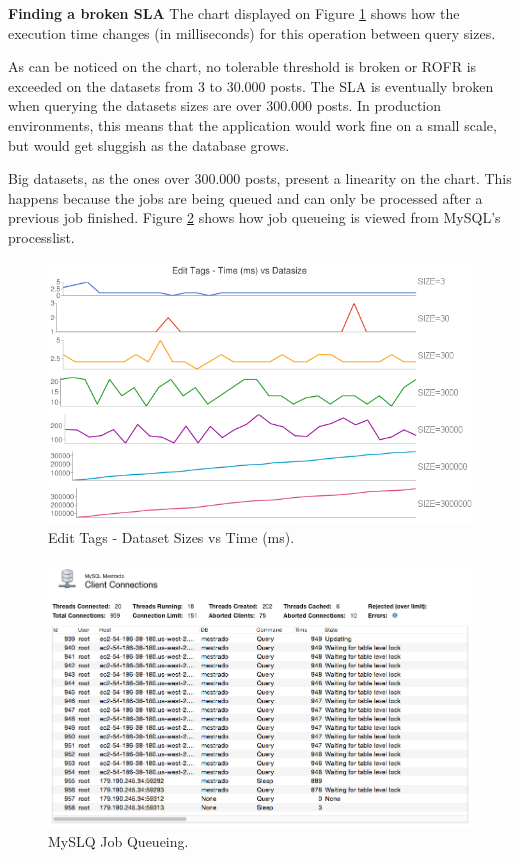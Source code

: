\textbf{Finding a broken SLA}
\hfill \break
The chart displayed on Figure \ref{fig:tags-scenairo-02-chart} shows how the execution time changes (in milliseconds) for this operation between query sizes. 

As can be noticed on the chart, no tolerable threshold is broken or ROFR is exceeded on the datasets from 3 to 30.000 posts. The SLA is eventually broken when querying the datasets sizes are over 300.000 posts. In production environments, this means that the application would work fine on a small scale, but would get sluggish as the database grows.

Big datasets, as the ones over 300.000 posts, present a linearity on the chart. This happens because the jobs are being queued and can only be processed after a previous job finished. Figure \ref{fig:queryQueuing} shows how job queueing is viewed from MySQL's processlist.  

\begin{figure}[ht!]
\centering
\includegraphics[width=150mm]{Imagens/second-scenario.png}
\caption{Edit Tags - Dataset Sizes vs Time (ms).\label{fig:tags-scenairo-02-chart}}
\end{figure}

\begin{figure}[ht!]
\centering
\includegraphics[width=120mm]{Imagens/queryQueueing.png}
\caption{MySLQ Job Queueing.\label{fig:queryQueuing}}
\end{figure}


